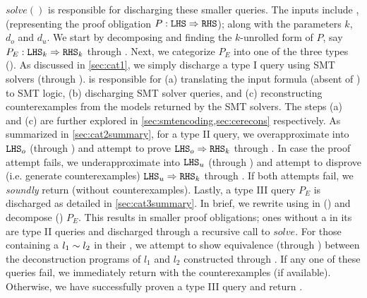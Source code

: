 $solve()$ is responsible for discharging these smaller queries.
The inputs include \lhs{}, \rhs{} (representing the proof obligation $P :{\tt LHS}{} \Rightarrow {\tt RHS}{}$);
along with the parameters $k$, $d_o$ and $d_u$.
We start by decomposing and finding the $k$-unrolled form of $P$, say $P_E : {\tt LHS}{}_k \Rightarrow {\tt RHS}{}_k$ through .
Next, we categorize $P_E$ into one of the three types ().
As discussed in \cref{sec:cat1}, we simply discharge a type I query using SMT solvers (through ).
 is responsible for (a) translating the input formula (absent of \recursiveRelations{})
to SMT logic, (b) discharging SMT solver queries, and
(c) reconstructing counterexamples from the models returned by the SMT solvers.
The steps (a) and (c) are further explored in \cref{sec:smtencoding,sec:cerecons} respectively.
As summarized in \cref{sec:cat2summary}, for a type II query, we overapproximate \lhs{} into ${\tt LHS}{}_o$ (through )
and attempt to prove ${\tt LHS}{}_o \Rightarrow {\tt RHS}{}_k$ through .
In case the proof attempt fails, we underapproximate \lhs{} into ${\tt LHS}{}_u$ (through )
and attempt to disprove (i.e. generate counterexamples) ${\tt LHS}{}_u \Rightarrow {\tt RHS}_k{}$ through .
If both attempts fail, we {\em soundly} return  (without counterexamples).
Lastly, a type III query $P_E$ is discharged as detailed in \cref{sec:cat3summary}.
In brief, we rewrite \rhs{} using \recursiveRelations{} in \lhs{} () and decompose () $P_E$.
This results in smaller proof obligations; ones without a \recursiveRelation{} in its \rhs{}
are type II queries and discharged through a recursive call to $solve$.
For those containing a \recursiveRelation{} $l_1 \sim{} l_2$ in their \rhs{},
we attempt to show equivalence (through ) between the deconstruction programs
of $l_1$ and $l_2$ constructed through .
If any one of these queries fail, we immediately return  with the counterexamples (if available).
Otherwise, we have successfully proven a type III query and return .
